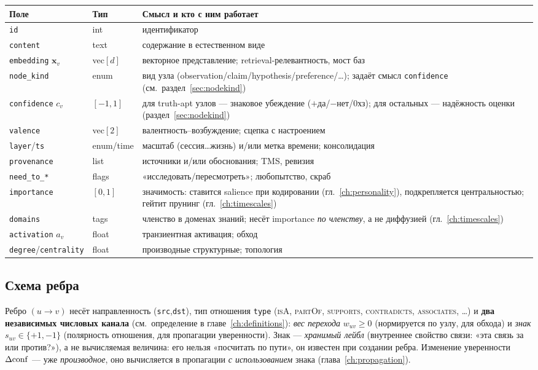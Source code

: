 \begin{longtable}{p{} p{} p{}}
\toprule
\textbf{Поле} & \textbf{Тип} & \textbf{Смысл и кто с ним работает} \\
\midrule
\endhead
\texttt{id} & int & идентификатор \\
\texttt{content} & text & содержание в естественном виде \\
\texttt{embedding} $\mathbf{x}_v$ & vec$[d]$ & векторное представление; retrieval-релевантность, мост баз \\
\texttt{node\_kind} & enum & вид узла (observation/claim/hypothesis/preference/\dots); задаёт смысл \texttt{confidence} (см.\ раздел~\ref{sec:nodekind}) \\
\texttt{confidence} $c_v$ & $[-1,1]$ & для truth-apt узлов — знаковое убеждение ($+$да/$-$нет/$0$хз); для остальных — надёжность оценки (раздел~\ref{sec:nodekind}) \\
\texttt{valence} & vec$[2]$ & валентность–возбуждение; сцепка с настроением \\
\texttt{layer}/\texttt{ts} & enum/time & масштаб (сессия\ldots жизнь) и/или метка времени; консолидация \\
\texttt{provenance} & list & источники и/или обоснования; TMS, ревизия \\
\texttt{need\_to\_*} & flags & «исследовать/пересмотреть»; любопытство, скраб \\
\texttt{importance} & $[0,1]$ & значимость: ставится salience при кодировании (гл.~\ref{ch:personality}), подкрепляется центральностью; гейтит прунинг (гл.~\ref{ch:timescales}) \\
\texttt{domains} & tags & членство в доменах знаний; несёт importance \emph{по членству}, а не диффузией (гл.~\ref{ch:timescales}) \\
\texttt{activation} $a_v$ & float & транзиентная активация; обход \\
\texttt{degree}/\texttt{centrality} & float & производные структурные; топология \\
\bottomrule
\end{longtable}

\subsection{Схема ребра}

Ребро $(u\to v)$ несёт направленность (\texttt{src},\texttt{dst}), тип отношения
\texttt{type} (\textsc{isA}, \textsc{partOf}, \textsc{supports},
\textsc{contradicts}, \textsc{associates}, \dots) и \textbf{два независимых числовых
канала} (см.\ определение в главе~\ref{ch:definitions}): \emph{вес перехода}
$w_{uv}\ge 0$ (нормируется по узлу, для обхода) и \emph{знак}
$s_{uv}\in\{+1,-1\}$ (полярность отношения, для пропагации уверенности). Знак —
\emph{хранимый лейбл} (внутреннее свойство связи: «эта связь за или против?»), а не
вычисляемая величина: его нельзя «посчитать по пути», он известен при создании ребра.
Изменение уверенности $\Delta\mathrm{conf}$ — уже \emph{производное}, оно вычисляется в
пропагации \emph{с использованием} знака (глава~\ref{ch:propagation}).

